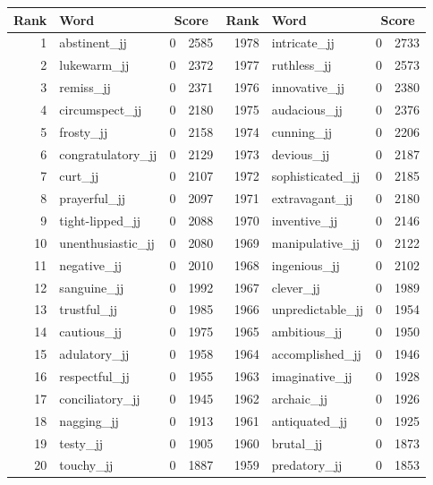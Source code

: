 \begin{table}[tbp]
    \begin{tabular}{| rlr@{.}l | rlr@{.}l |}
    \hline
    \textbf{Rank} & \textbf{Word} & \multicolumn{2}{c|}{\textbf{Score}} & \textbf{Rank} & \textbf{Word} & \multicolumn{2}{c|}{\textbf{Score}} \\
    \hline
    1 & abstinent\_jj & 0 & 2585    &    1978 & intricate\_jj & 0 & 2733 \\
    2 & lukewarm\_jj & 0 & 2372    &    1977 & ruthless\_jj & 0 & 2573 \\
    3 & remiss\_jj & 0 & 2371    &    1976 & innovative\_jj & 0 & 2380 \\
    4 & circumspect\_jj & 0 & 2180    &    1975 & audacious\_jj & 0 & 2376 \\
    5 & frosty\_jj & 0 & 2158    &    1974 & cunning\_jj & 0 & 2206 \\
    6 & congratulatory\_jj & 0 & 2129    &    1973 & devious\_jj & 0 & 2187 \\
    7 & curt\_jj & 0 & 2107    &    1972 & sophisticated\_jj & 0 & 2185 \\
    8 & prayerful\_jj & 0 & 2097    &    1971 & extravagant\_jj & 0 & 2180 \\
    9 & tight-lipped\_jj & 0 & 2088    &    1970 & inventive\_jj & 0 & 2146 \\
    10 & unenthusiastic\_jj & 0 & 2080    &    1969 & manipulative\_jj & 0 & 2122 \\
    11 & negative\_jj & 0 & 2010    &    1968 & ingenious\_jj & 0 & 2102 \\
    12 & sanguine\_jj & 0 & 1992    &    1967 & clever\_jj & 0 & 1989 \\
    13 & trustful\_jj & 0 & 1985    &    1966 & unpredictable\_jj & 0 & 1954 \\
    14 & cautious\_jj & 0 & 1975    &    1965 & ambitious\_jj & 0 & 1950 \\
    15 & adulatory\_jj & 0 & 1958    &    1964 & accomplished\_jj & 0 & 1946 \\
    16 & respectful\_jj & 0 & 1955    &    1963 & imaginative\_jj & 0 & 1928 \\
    17 & conciliatory\_jj & 0 & 1945    &    1962 & archaic\_jj & 0 & 1926 \\
    18 & nagging\_jj & 0 & 1913    &    1961 & antiquated\_jj & 0 & 1925 \\
    19 & testy\_jj & 0 & 1905    &    1960 & brutal\_jj & 0 & 1873 \\
    20 & touchy\_jj & 0 & 1887    &    1959 & predatory\_jj & 0 & 1853 \\

\end{tabular}
\end{table}
